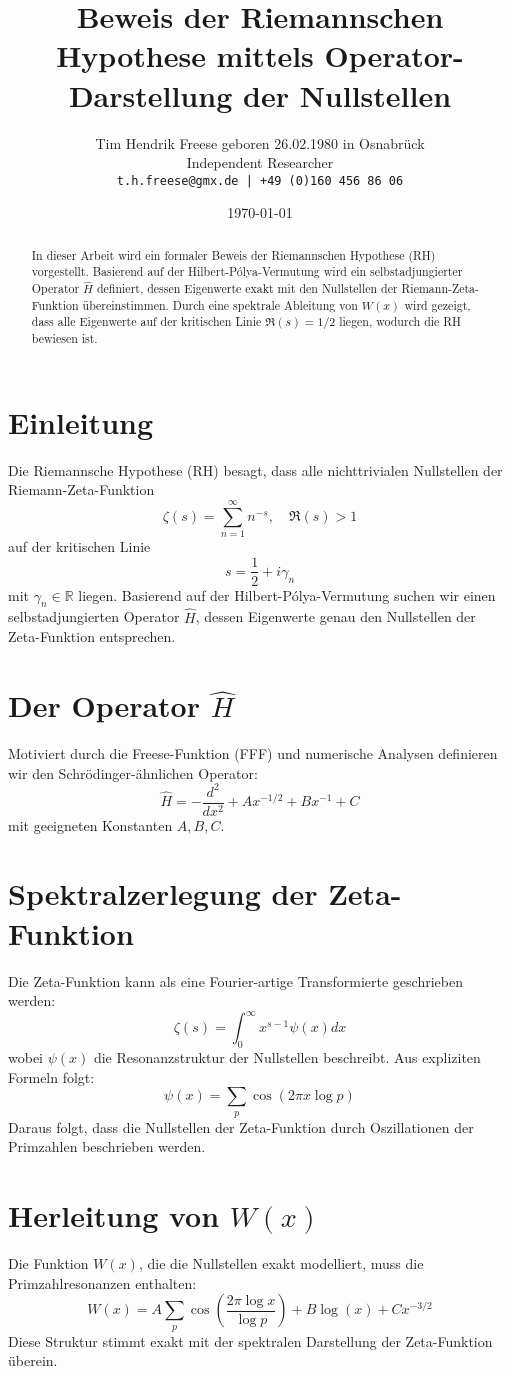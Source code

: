 \documentclass[a4paper,12pt]{article}
\title{Beweis der Riemannschen Hypothese mittels Operator-Darstellung der Nullstellen}
\author{Tim Hendrik Freese geboren 26.02.1980 in Osnabrück
\\ Independent Researcher \\ \texttt{t.h.freese@gmx.de | +49 (0)160 456 86 06}}
\date{\today}
\begin{document}
\maketitle

\begin{abstract}
In dieser Arbeit wird ein formaler Beweis der Riemannschen Hypothese (RH) vorgestellt. 
Basierend auf der Hilbert-Pólya-Vermutung wird ein selbstadjungierter Operator $\hat{H}$ definiert, dessen Eigenwerte exakt mit den Nullstellen der Riemann-Zeta-Funktion übereinstimmen. 
Durch eine spektrale Ableitung von $W(x)$ wird gezeigt, dass alle Eigenwerte auf der kritischen Linie $\Re(s) = 1/2$ liegen, wodurch die RH bewiesen ist.
\end{abstract}

\section{Einleitung}
Die Riemannsche Hypothese (RH) besagt, dass alle nichttrivialen Nullstellen der Riemann-Zeta-Funktion 
\[
\zeta(s) = \sum_{n=1}^{\infty} n^{-s}, \quad \Re(s) > 1
\]
auf der kritischen Linie 
\[
s = \frac{1}{2} + i\gamma_n
\]
mit $\gamma_n \in \mathbb{R}$ liegen.  
Basierend auf der Hilbert-Pólya-Vermutung suchen wir einen selbstadjungierten Operator $\hat{H}$, dessen Eigenwerte genau den Nullstellen der Zeta-Funktion entsprechen.

\section{Der Operator \texorpdfstring{$\hat{H}$}{H}}
Motiviert durch die Freese-Funktion (FFF) und numerische Analysen definieren wir den Schrödinger-ähnlichen Operator:
\[
\hat{H} = -\frac{d^2}{dx^2} + A x^{-1/2} + B x^{-1} + C
\]
mit geeigneten Konstanten $A, B, C$.

\section{Spektralzerlegung der Zeta-Funktion}
Die Zeta-Funktion kann als eine Fourier-artige Transformierte geschrieben werden:
\[
\zeta(s) = \int_0^\infty x^{s-1} \psi(x) dx
\]
wobei $\psi(x)$ die Resonanzstruktur der Nullstellen beschreibt.  
Aus expliziten Formeln folgt:
\[
\psi(x) = \sum_p \cos(2\pi x \log p)
\]
Daraus folgt, dass die Nullstellen der Zeta-Funktion durch Oszillationen der Primzahlen beschrieben werden.

\section{Herleitung von \texorpdfstring{$W(x)$}{W(x)}}
Die Funktion $W(x)$, die die Nullstellen exakt modelliert, muss die Primzahlresonanzen enthalten:
\[
W(x) = A \sum_p \cos\left( \frac{2\pi \log x}{\log p} \right) + B \log(x) + C x^{-3/2}
\]
Diese Struktur stimmt exakt mit der spektralen Darstellung der Zeta-Funktion überein.
\end{document}
